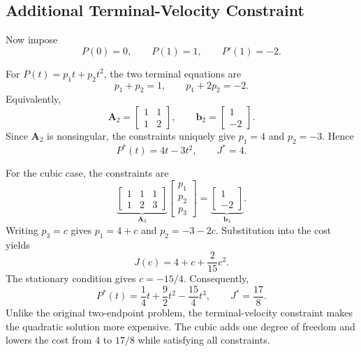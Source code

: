 \documentclass[letterpaper,10pt,conference]{IEEEtran}
\newcommand{\vect}[1]{\bm{#1}}
\begin{document}
\subsection{Additional Terminal-Velocity Constraint}
Now impose
\begin{equation}
P(0)=0,\qquad P(1)=1,\qquad P'(1)=-2.
\end{equation}

For $P(t)=p_1t+p_2t^2$, the two terminal equations are
\begin{equation}
p_1+p_2=1,\qquad p_1+2p_2=-2.
\end{equation}
Equivalently,
\begin{equation}
\vect{A}_2=\begin{bmatrix}1&1\\1&2\end{bmatrix},
\qquad
\vect{b}_2=\begin{bmatrix}1\\-2\end{bmatrix}.
\end{equation}
Since $\vect{A}_2$ is nonsingular, the constraints uniquely give $p_1=4$ and $p_2=-3$. Hence
\begin{equation}
\boxed{P^*(t)=4t-3t^2,\qquad J^*=4.}
\end{equation}

For the cubic case, the constraints are
\begin{equation}
\underbrace{\begin{bmatrix}1&1&1\\1&2&3\end{bmatrix}}_{\vect{A}_3}
\begin{bmatrix}p_1\\p_2\\p_3\end{bmatrix}
=\underbrace{\begin{bmatrix}1\\-2\end{bmatrix}}_{\vect{b}_3}.
\end{equation}
Writing $p_3=c$ gives $p_1=4+c$ and $p_2=-3-2c$. Substitution into the cost yields
\begin{equation}
J(c)=4+c+\frac{2}{15}c^2.
\end{equation}
The stationary condition gives $c=-15/4$. Consequently,
\begin{equation}
\boxed{P^*(t)=\frac14t+\frac92t^2-\frac{15}{4}t^3,
\qquad J^*=\frac{17}{8}.}
\end{equation}
Unlike the original two-endpoint problem, the terminal-velocity constraint makes the quadratic solution more expensive. The cubic adds one degree of freedom and lowers the cost from $4$ to $17/8$ while satisfying all constraints.
\end{document}
